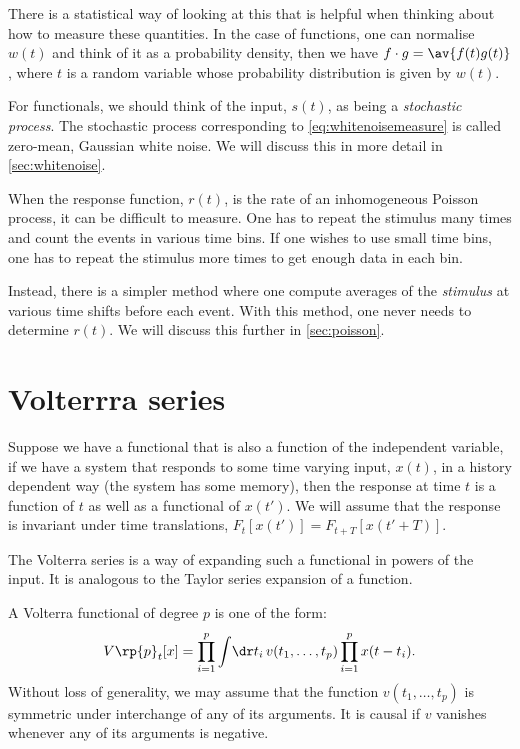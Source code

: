\documentclass[12pt]{article}
\begin{document}
There is a statistical way of looking at this that is helpful when thinking about how to measure these quantities.
In the case of functions, one can normalise $w(t)$ and think of it as a probability density, then we have $f \cdot g = \av{f(t)g(t)}$, where $t$ is a random variable whose probability distribution is given by $w(t)$.

For functionals, we should think of the input, $s(t)$, as being a \emph{stochastic process}.
The stochastic process corresponding to \eqref{eq:whitenoisemeasure} is called zero-mean, Gaussian white noise.
We will discuss this in more detail in \cref{sec:whitenoise}.

When the response function, $r(t)$, is the rate of an inhomogeneous Poisson process, it can be difficult to measure.
One has to repeat the stimulus many times and count the events in various time bins.
If one wishes to use small time bins, one has to repeat the stimulus more times to get enough data in each bin.

Instead, there is a simpler method where one compute averages of the \emph{stimulus} at various time shifts before each event.
With this method, one never needs to determine $r(t)$.
We will discuss this further in \cref{sec:poisson}.


\section{Volterrra series}\label{sec:volterra}

Suppose we have a functional that is also a function of the independent variable, \eg if we have a system that responds to some time varying input, $x(t)$, in a history dependent way (\ie the system has some memory), then the response at time $t$ is a function of $t$ as well as a functional of $x(t')$.
We will assume that the response is invariant under time translations, \ie $F_t[x(t')]=F_{t+T}[x(t'+T)]$.

The Volterra series is a way of expanding such a functional in powers of the input.
It is analogous to the Taylor series expansion of a function.

\begin{defn}
  A Volterra functional of degree $p$ is one of the form:
  \begin{equation}\label{eq:volfunc}
    V\rp{p}_t[x] = \prod_{i=1}^p \int\!\dr t_i\,  v(t_1,\ldots,t_p) \prod_{i=1}^p x(t-t_i).
  \end{equation}
  Without loss of generality, we may assume that the function $v(t_1,\ldots,t_p)$ is symmetric under interchange of any of its arguments.
  It is causal if $v$ vanishes whenever any of its arguments is negative.
\end{defn}
\end{document}
